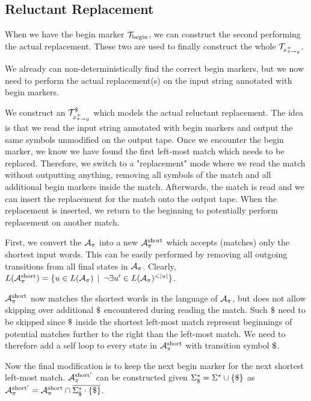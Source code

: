 \subsection{Reluctant Replacement \nft}

When we have the begin marker \nft $\mathcal{T}_{\text{begin}}$, we can construct the second \nft performing the actual replacement.
These two \nfts are used to finally construct the whole $\mathcal{T}_{x^{+}_{\pi \rightarrow y}}$.

We already can non-deterministically find the correct begin markers, but we now need to perform the actual replacement(s) on the input string annotated with begin markers.

We construct an \nft $\mathcal{T}^\$_{x^{+}_{\pi \rightarrow y}}$ which models the actual reluctant replacement.
The idea is that we read the input string annotated with begin markers and output the same symbols unmodified on the output tape.
Once we encounter the begin marker, we know we have found the first left-most match which needs to be replaced.
Therefore, we switch to a "replacement" mode where we read the match without outputting anything, removing all symbols of the match and all additional begin markers inside the match.
Afterwards, the match is read and we can insert the replacement for the match onto the output tape.
When the replacement is inserted, we return to the beginning to potentially perform replacement on another match.

First, we convert the $\mathcal{A}_{\pi}$ into a new \nfa $\mathcal{A}^{\text{short}}_{\pi}$ which accepts (matches) only the shortest input words.
This can be easily performed by removing all outgoing transitions from all final states in $\mathcal{A}_{\pi}$.
Clearly, $\langof{\aut^{\text{short}}_{\pi}} = \{ u \in \langof{\aut_{\pi}} \,\mid\, \neg \exists u' \in \langof{\aut_{\pi}}^{<|u|} \}$.

$\mathcal{A}^{\text{short}}_{\pi}$ now matches the shortest words in the language of $\mathcal{A}_{\pi}$, but does not allow skipping over additional $\marker$ encountered during reading the match.
Such $\marker$ need to be skipped since $\marker$ inside the shortest left-most match represent beginnings of potential matches further to the right than the left-most match.
We need to therefore add a self loop to every state in $\mathcal{A}^{\text{short}}_{\pi}$ with transition symbol $\marker$.

Now the final modification is to keep the next begin marker for the next shortest left-most match. $\mathcal{A}^{\text{short}'}_{\pi}$ can be constructed given $\Sigma^*_\$ = \Sigma^* \cup \{ \$ \}$ as $\mathcal{A}^{\text{short}'}_{\pi} = \mathcal{A}^{\text{short}}_{\pi} \cap \overline{\Sigma^*_\$ \cdot \{ \$ \}}$.

